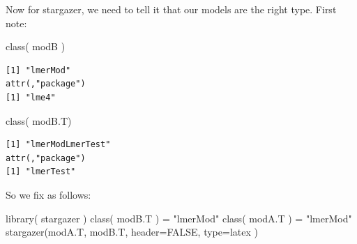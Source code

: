 \documentclass[
  letterpaper,
  DIV=11,
  numbers=noendperiod]{scrreprt}
\newenvironment{Shaded}{\begin{snugshade}}{\end{snugshade}}
\newcommand{\AttributeTok}[1]{\textcolor[rgb]{0.49,0.56,0.16}{#1}}
\newcommand{\ConstantTok}[1]{\textcolor[rgb]{0.53,0.00,0.00}{#1}}
\newcommand{\FunctionTok}[1]{\textcolor[rgb]{0.02,0.16,0.49}{#1}}
\newcommand{\NormalTok}[1]{\textcolor[rgb]{0.00,0.44,0.13}{#1}}
\newcommand{\OtherTok}[1]{\textcolor[rgb]{0.00,0.44,0.13}{#1}}
\newcommand{\StringTok}[1]{\textcolor[rgb]{0.25,0.44,0.63}{#1}}
\begin{document}
Now for stargazer, we need to tell it that our models are the right
type. First note:

\begin{Shaded}
\begin{Highlighting}[]
\FunctionTok{class}\NormalTok{( modB )}
\end{Highlighting}
\end{Shaded}

\begin{verbatim}
[1] "lmerMod"
attr(,"package")
[1] "lme4"
\end{verbatim}

\begin{Shaded}
\begin{Highlighting}[]
\FunctionTok{class}\NormalTok{( modB.T)}
\end{Highlighting}
\end{Shaded}

\begin{verbatim}
[1] "lmerModLmerTest"
attr(,"package")
[1] "lmerTest"
\end{verbatim}

So we fix as follows:

\begin{Shaded}
\begin{Highlighting}[]
\FunctionTok{library}\NormalTok{( stargazer )}
\FunctionTok{class}\NormalTok{( modB.T ) }\OtherTok{=} \StringTok{"lmerMod"} 
\FunctionTok{class}\NormalTok{( modA.T ) }\OtherTok{=} \StringTok{"lmerMod"} 
\FunctionTok{stargazer}\NormalTok{(modA.T, modB.T, }\AttributeTok{header=}\ConstantTok{FALSE}\NormalTok{, }\AttributeTok{type=}\StringTok{\textquotesingle{}latex\textquotesingle{}}\NormalTok{ )}
\end{Highlighting}
\end{Shaded}
\end{document}
